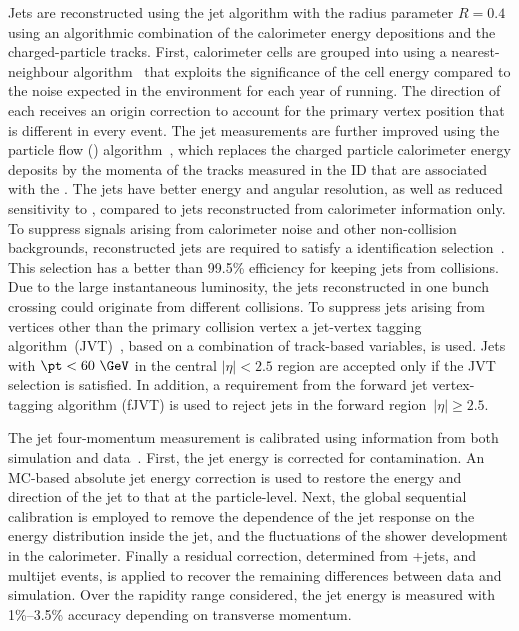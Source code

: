\documentclass[atlasdraft=false, cernpreprint, UKenglish, texmf, orcidlogo]{atlasdoc}
\begin{document}
Jets are reconstructed using the \antikt jet algorithm with the radius parameter \(R=0.4\) 
using an algorithmic combination of the calorimeter energy depositions and the charged-particle tracks.
First, calorimeter cells are grouped into \topos{} using a nearest-neighbour
algorithm~\cite{PERF-2014-07} that exploits the significance of the cell energy compared to the noise expected in the \pileup{} environment for each year of running.
The direction of each \topo{} receives an {origin  correction} to account for the primary vertex position that is different in every event.
The jet measurements are further improved using the particle flow () algorithm~\cite{PERF-2015-09}, which replaces the charged particle
calorimeter energy deposits by the momenta of the tracks measured in the ID that are associated with the \topos. 
The  jets have better energy and angular resolution, as well as reduced sensitivity to \pileup{}, compared to jets reconstructed
from calorimeter information only.
To suppress signals arising from calorimeter noise and other non-collision backgrounds, reconstructed jets are required to satisfy
a \looseID identification selection~\cite{ATLAS-CONF-2015-029}. This selection has a better than 99.5\% efficiency for keeping jets from \pp collisions.
Due to the large instantaneous luminosity, the jets reconstructed in one bunch crossing could originate from different \pp collisions.
To suppress jets arising from vertices other than the primary collision vertex a jet-vertex tagging algorithm~(JVT)~\cite{PERF-2014-03,ATL-PHYS-PUB-2015-034}, 
based on a combination of track-based variables, is used.
Jets with  \(\pt<60~\GeV\) in the central \(|\eta|<2.5\) region are accepted only if the \tightID{} JVT selection 
is satisfied.
In addition, a \tightID requirement from the forward jet vertex-tagging algorithm (fJVT)
is used to reject \pileup jets in the forward region~\(|\eta|\ge2.5\).
 
The jet four-momentum measurement is calibrated using information from both simulation and data~\cite{JETM-2018-05}.
First, the jet energy is corrected for \pileup{} contamination.
An MC-based absolute jet energy correction is used to restore the energy and direction of the jet to that at the particle-level.
Next, the {global sequential calibration} is employed to remove the dependence of the jet response on the energy distribution inside the jet,
and the fluctuations of the shower development in the calorimeter.
Finally a residual  \insitu{} correction, determined from \Z+jets, \gammajet{} and multijet events,
is applied to recover the remaining differences between data and simulation.
Over the rapidity range considered, the jet energy is measured with 1\%--3.5\% accuracy depending on transverse momentum.
 
\end{document}
